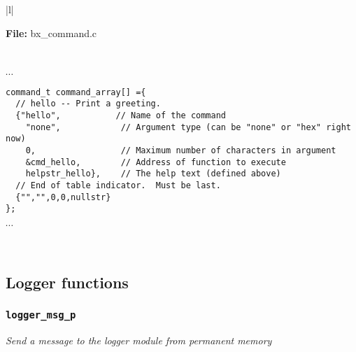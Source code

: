 \begin{center}
  \vspace{-\baselineskip}
  \begin{tabular}{|l|} \hline
    \begin{minipage}[c]{\textwidth - 2\tabcolsep}
      \textbf{File:}
      bx\_command.c
    \end{minipage}\\
    \begin{minipage}[c]{\textwidth - 2\tabcolsep}
      \vspace{0.5\baselineskip}
      $\cdots$ \\
      \begin{minipage}[c]{\textwidth - 2\tabcolsep}
        \lstset{language=c}
        \begin{lstlisting}
command_t command_array[] ={
  // hello -- Print a greeting.
  {"hello",           // Name of the command
    "none",            // Argument type (can be "none" or "hex" right now)
    0,                 // Maximum number of characters in argument
    &cmd_hello,        // Address of function to execute
    helpstr_hello},    // The help text (defined above)  
  // End of table indicator.  Must be last.
  {"","",0,0,nullstr}
};      
\end{lstlisting}
      \end{minipage}
      $\cdots$\\
      \vspace{-0.5\baselineskip}
    \end{minipage}\\
    \hline
  \end{tabular}
\end{center}


\clearpage
\subsection{Logger functions}

\subsubsection{\texttt{logger\_msg\_p}}
\textsl{Send a message to the logger module from permanent memory}  


